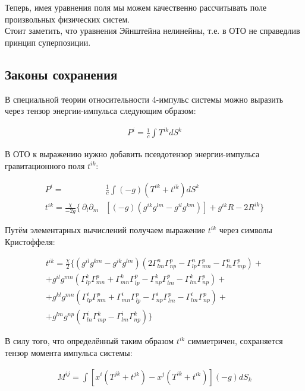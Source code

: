 \documentclass[a4paper,14pt]{article}
\begin{document}
	Теперь, имея уравнения поля мы можем качественно рассчитывать поле произвольных физических систем. \\

	Стоит заметить, что уравнения Эйнштейна нелинейны, т.е. в ОТО не справедлив принцип суперпозиции.

\subsection*{Законы сохранения}

	В специальной теории относительности 4-импульс системы можно выразить через тензор энергии-импульса следующим образом:

	\begin{align*}
		P^i = \frac{1}{c} \int T^{ik} dS^k
	\end{align*}

	В ОТО к выражению нужно добавить псевдотензор энергии-импульса гравитационного поля $t^{ik}$:

	\begin{align*}
		P^i = & \frac{1}{c} \int (-g)(T^{ik} + t^{ik}) dS^k \\
		t^{ik} = \frac{ \chi }{-2g} \{ \: \partial_l \partial_m & [(-g)(g^{ik} g^{lm} - g^{il} g^{km})] + g^{ik} R - 2R^{ik} \}
	\end{align*}

	Путём элементарных вычислений получаем выражение $t^{ik}$ через символы Кристоффеля:

	\begin{align*}
		t^{ik} = \frac{ \chi }{2} \{ ( g^{il} g^{km} - g^{ik} g^{lm} )( 2\Gamma_{lm}^n \Gamma_{np}^p - \Gamma_{lp}^n \Gamma_{mn}^p - \Gamma_{ln}^n \Gamma_{mp}^p ) + \\
		+ g^{il} g^{mn} ( \Gamma_{lp}^k \Gamma_{mn}^p + \Gamma_{mn}^k \Gamma_{lp}^p - \Gamma_{np}^k \Gamma_{lm}^p - \Gamma_{lm}^k \Gamma_{np}^p ) + \\
		+ g^{kl} g^{mn} ( \Gamma_{lp}^i \Gamma_{mn}^p + \Gamma_{mn}^i \Gamma_{lp}^p - \Gamma_{np}^i \Gamma_{lm}^p - \Gamma_{lm}^i \Gamma_{np}^p ) + \\
		+ g^{lm} g^{np} ( \Gamma_{ln}^i \Gamma_{mp}^k - \Gamma_{lm}^i \Gamma_{np}^k ) \}
	\end{align*}

	В силу того, что определённый таким образом $t^{ik}$ симметричен, сохраняется тензор момента импульса системы:

	\begin{align*}
		M^{ij} = \int [ x^i ( T^{jk} + t^{jk} ) - x^j ( T^{ik} + t^{ik} )](-g)dS_k
	\end{align*}
\end{document}
